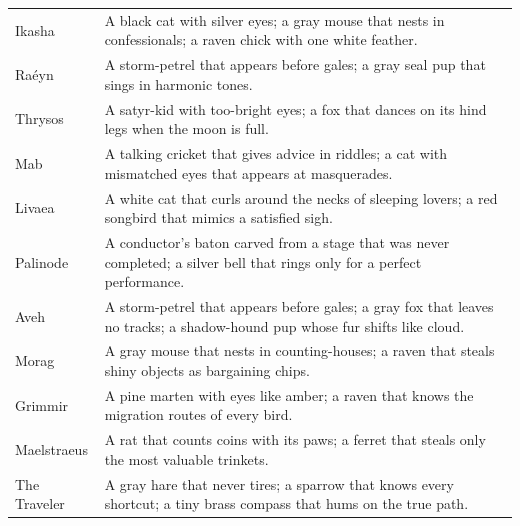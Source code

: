 \begin{longtable}{@{}p{4.2cm}p{9.4cm}@{}}
  Ikasha & A black cat with silver eyes; a gray mouse that nests in confessionals; a raven chick with one white feather. \\
  Raéyn & A storm-petrel that appears before gales; a gray seal pup that sings in harmonic tones. \\
  Thrysos & A satyr-kid with too-bright eyes; a fox that dances on its hind legs when the moon is full. \\
  Mab & A talking cricket that gives advice in riddles; a cat with mismatched eyes that appears at masquerades. \\
  Livaea & A white cat that curls around the necks of sleeping lovers; a red songbird that mimics a satisfied sigh. \\
  Palinode & A conductor's baton carved from a stage that was never completed; a silver bell that rings only for a perfect performance. \\
  Aveh & A storm-petrel that appears before gales; a gray fox that leaves no tracks; a shadow-hound pup whose fur shifts like cloud. \\
  Morag & A gray mouse that nests in counting-houses; a raven that steals shiny objects as bargaining chips. \\
  Grimmir & A pine marten with eyes like amber; a raven that knows the migration routes of every bird. \\
  Maelstraeus & A rat that counts coins with its paws; a ferret that steals only the most valuable trinkets. \\
  The Traveler & A gray hare that never tires; a sparrow that knows every shortcut; a tiny brass compass that hums on the true path. \\


\end{longtable}
